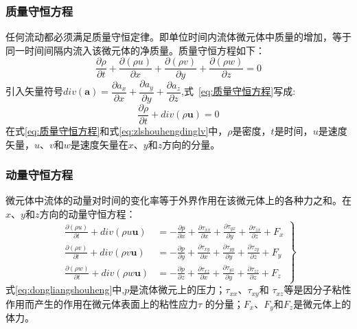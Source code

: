 \subsubsection{质量守恒方程}
任何流动都必须满足质量守恒定律。即单位时间内流体微元体中质量的增加，等于同一时间间隔内流入该微元体的净质量。质量守恒方程如下：
\begin{equation}
\frac{\partial\rho }{\partial t}+\frac{\partial(\rho u) }{\partial x}+\frac{\partial(\rho v) }{\partial y}+\frac{\partial(\rho w) }{\partial z}=0\label{eq:质量守恒方程}
\end{equation}
引入矢量符号$div(\mathbf{a})=\dfrac{\partial a_x}{\partial x}+\dfrac{\partial a_y}{\partial y}+\dfrac{\partial a_z}{\partial z}$,式~\ref{eq:质量守恒方程}写成:
\begin{equation}
\frac{\partial\rho }{\partial t}+div(\rho \mathbf{u}) = 0 \label{eq:zlshouhengdinglv}
\end{equation}
在式\ref{eq:质量守恒方程}和式\ref{eq:zlshouhengdinglv}中，$\rho$是密度，$t$是时间，$u$是速度矢量，$u$、$v$和$w$是速度矢量在$x$、$y$和$z$方向的分量。
\subsubsection{ 动量守恒方程}
微元体中流体的动量对时间的变化率等于外界作用在该微元体上的各种力之和。在$x$、$y$和$z$方向的动量守恒方程：
\begin{equation}\left.
\begin{aligned}
\frac{\partial(\rho u) }{\partial t}+div(\rho u\mathbf{u}) &=-\frac{\partial p  }{\partial x}+\frac{\partial \tau_{xx}  }{\partial x}+\frac{\partial \tau_{yx}  }{\partial y}+\frac{\partial \tau_{zx}  }{\partial z}+F_x\\
\frac{\partial(\rho v) }{\partial t}+div(\rho v\mathbf{u}) &=-\frac{\partial p  }{\partial y}+\frac{\partial \tau_{xy}  }{\partial x}+\frac{\partial \tau_{yy}  }{\partial y}+\frac{\partial \tau_{zy}  }{\partial z}+F_y\\
\frac{\partial(\rho w) }{\partial t}+div(\rho w\mathbf{u}) &=-\frac{\partial p  }{\partial z}+\frac{\partial \tau_{xz}  }{\partial x}+\frac{\partial \tau_{yz}  }{\partial y}+\frac{\partial \tau_{zz}  }{\partial z}+F_z
\end{aligned}\right\}
\end{equation}\label{eq:dongliangshouheng}
式\ref{eq:dongliangshouheng}中,$p$是流体微元上的压力；$\tau_{xx}$、$\tau_{xy}$和 $\tau_{xz}$等是因分子粘性作用而产生的作用在微元体表面上的粘性应力$\tau$ 的分量；$F_x$、$F_y$和$F_z$是微元体上的体力。
